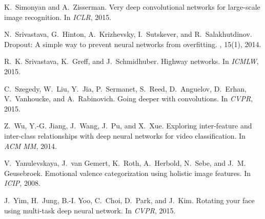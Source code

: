 \documentclass{sig-alternate-05-2015}
\begin{document}
\begin{thebibliography}{10}
K.~Simonyan and A.~Zisserman.
\newblock Very deep convolutional networks for large-scale image recognition.
\newblock In {\em ICLR}, 2015.

N.~Srivastava, G.~Hinton, A.~Krizhevsky, I.~Sutskever, and R.~Salakhutdinov.
\newblock Dropout: {A} simple way to prevent neural networks from overfitting.
, 15(1), 2014.

R.~K. Srivastava, K.~Greff, and J.~Schmidhuber.
\newblock Highway networks.
\newblock In {\em ICMLW}, 2015.

C.~Szegedy, W.~Liu, Y.~Jia, P.~Sermanet, S.~Reed, D.~Anguelov, D.~Erhan,
  V.~Vanhoucke, and A.~Rabinovich.
\newblock Going deeper with convolutions.
\newblock In {\em CVPR}, 2015.

Z.~Wu, Y.-G. Jiang, J.~Wang, J.~Pu, and X.~Xue.
\newblock Exploring inter-feature and inter-class relationships with deep
  neural networks for video classification.
\newblock In {\em ACM MM}, 2014.

V.~Yanulevskaya, J.~van Gemert, K.~Roth, A.~Herbold, N.~Sebe, and J.~M.
  Geusebroek.
\newblock Emotional valence categorization using holistic image features.
\newblock In {\em ICIP}, 2008.

J.~Yim, H.~Jung, B.-I. Yoo, C.~Choi, D.~Park, and J.~Kim.
\newblock Rotating your face using multi-task deep neural network.
\newblock In {\em CVPR}, 2015.

\end{thebibliography}
\end{document}
